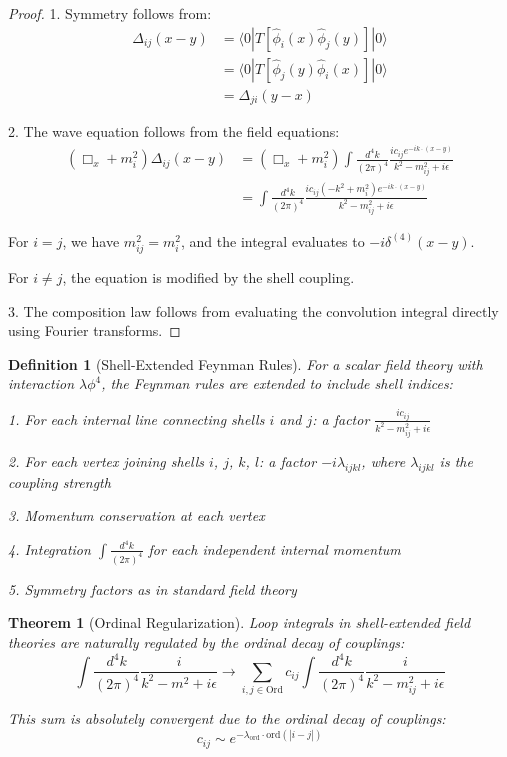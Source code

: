 \documentclass[12pt,a4paper]{article}
\newtheorem{theorem}{Theorem}[section]
\newtheorem{definition}{Definition}[section]
\newcommand{\ord}{\text{ord}}
\begin{document}
\begin{proof}
1. Symmetry follows from:
\begin{align}
\Delta_{ij}(x-y) &= \langle 0|T[\hat{\phi}_i(x)\hat{\phi}_j(y)]|0\rangle \\
&= \langle 0|T[\hat{\phi}_j(y)\hat{\phi}_i(x)]|0\rangle \\
&= \Delta_{ji}(y-x)
\end{align}

2. The wave equation follows from the field equations:
\begin{align}
(\Box_x + m_i^2)\Delta_{ij}(x-y) &= (\Box_x + m_i^2)\int \frac{d^4k}{(2\pi)^4} \frac{ic_{ij}e^{-ik \cdot (x-y)}}{k^2 - m_{ij}^2 + i\epsilon} \\
&= \int \frac{d^4k}{(2\pi)^4} \frac{ic_{ij}(-k^2 + m_i^2)e^{-ik \cdot (x-y)}}{k^2 - m_{ij}^2 + i\epsilon}
\end{align}

For $i = j$, we have $m_{ij}^2 = m_i^2$, and the integral evaluates to $-i\delta^{(4)}(x-y)$.

For $i \neq j$, the equation is modified by the shell coupling.

3. The composition law follows from evaluating the convolution integral directly using Fourier transforms.
\end{proof}

\begin{definition}[Shell-Extended Feynman Rules]
\label{def:feynman-rules}
For a scalar field theory with interaction $\lambda \phi^4$, the Feynman rules are extended to include shell indices:

1. For each internal line connecting shells $i$ and $j$: a factor $\frac{ic_{ij}}{k^2 - m_{ij}^2 + i\epsilon}$

2. For each vertex joining shells $i$, $j$, $k$, $l$: a factor $-i\lambda_{ijkl}$, where $\lambda_{ijkl}$ is the coupling strength

3. Momentum conservation at each vertex

4. Integration $\int \frac{d^4k}{(2\pi)^4}$ for each independent internal momentum

5. Symmetry factors as in standard field theory
\end{definition}

\begin{theorem}[Ordinal Regularization]
\label{thm:ordinal-regularization}
Loop integrals in shell-extended field theories are naturally regulated by the ordinal decay of couplings:
\begin{equation}
\int \frac{d^4k}{(2\pi)^4} \frac{i}{k^2 - m^2 + i\epsilon} \to \sum_{i,j \in \text{Ord}} c_{ij} \int \frac{d^4k}{(2\pi)^4} \frac{i}{k^2 - m_{ij}^2 + i\epsilon}
\end{equation}

This sum is absolutely convergent due to the ordinal decay of couplings:
\begin{equation}
c_{ij} \sim e^{-\lambda_{\ord} \cdot \ord(|i-j|)}
\end{equation}
\end{theorem}
\end{document}
